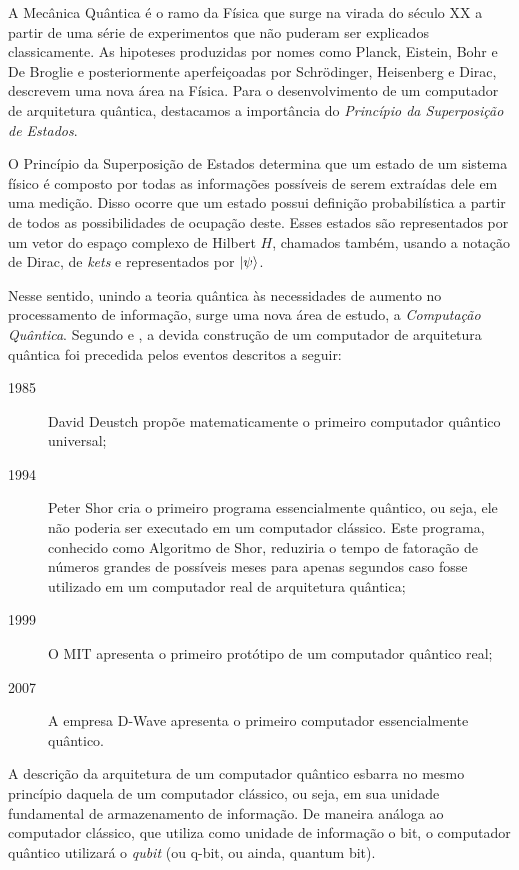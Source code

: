 \documentclass[12pt,oneside,brazil,hidelinks,article,sumario=tradicional,a4paper]{abntex2}
\begin{document}
A Mecânica Quântica é o ramo da Física que surge na virada do século XX a partir de uma série de experimentos que não puderam ser explicados classicamente. As hipoteses produzidas por nomes como Planck, Eistein, Bohr e De Broglie e posteriormente aperfeiçoadas por Schrödinger, Heisenberg e Dirac, descrevem uma nova área na Física. Para o desenvolvimento de um computador de arquitetura quântica, destacamos a importância do \textit{Princípio da Superposição de Estados}.

O Princípio da Superposição de Estados determina que um estado de um sistema físico é composto por todas as informações possíveis de serem extraídas dele em uma medição. Disso ocorre que um estado possui definição probabilística a partir de todos as possibilidades de ocupação deste. Esses estados são representados por um vetor do espaço complexo de Hilbert $H$, chamados também, usando a notação de Dirac, de \textit{kets} e representados por $\ket{\psi}$.

Nesse sentido, unindo a teoria quântica às necessidades de aumento no processamento de informação, surge uma nova área de estudo, a \textit{Computação Quântica}. Segundo \textcite{CompInfoQuantica} e \textcite{dwave}, a devida construção de um computador de arquitetura quântica foi precedida pelos eventos descritos a seguir:

\begin{description}
  \item[1985] David Deustch propõe matematicamente o primeiro computador quântico universal;
  \item[1994] Peter Shor cria o primeiro programa essencialmente quântico, ou seja, ele não poderia ser executado em um computador clássico. Este programa, conhecido como Algoritmo de Shor, reduziria o tempo de fatoração de números grandes de possíveis meses para apenas segundos caso fosse utilizado em um computador real de arquitetura quântica;
  \item[1999] O MIT apresenta o primeiro protótipo de um computador quântico real;
  \item[2007] A empresa D-Wave apresenta o primeiro computador essencialmente quântico.
\end{description}

A descrição da arquitetura de um computador quântico esbarra no mesmo princípio daquela de um computador clássico, ou seja, em sua unidade fundamental de armazenamento de informação. De maneira análoga ao computador clássico, que utiliza como unidade de informação o bit, o computador quântico utilizará o \textit{qubit} (ou q-bit, ou ainda, quantum bit).
\end{document}
